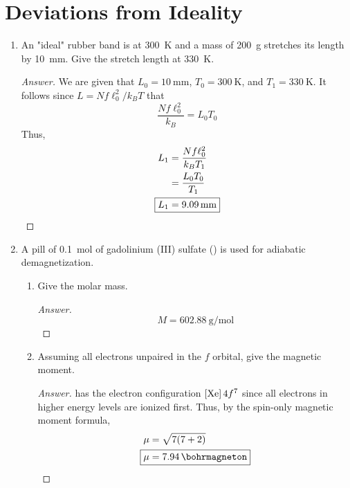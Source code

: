 \documentclass[../psets.tex]{subfiles}
\begin{document}
\section{Deviations from Ideality}
\begin{enumerate}
    \item {}An "ideal" rubber band is at \SI{300}{\kelvin} and a mass of \SI{200}{\gram} stretches its length by \SI{10}{\milli\meter}. Give the stretch length at \SI{330}{\kelvin}.
    \begin{proof}[Answer]
        We are given that $L_0=\SI{10}{\milli\meter}$, $T_0=\SI{300}{\kelvin}$, and $T_1=\SI{330}{\kelvin}$. It follows since $L=Nf\ell_0^2/k_BT$ that
        \begin{equation*}
            \frac{Nf\ell_0^2}{k_B} = L_0T_0
        \end{equation*}
        Thus,
        \begin{align*}
            L_1 &= \frac{Nf\ell_0^2}{k_BT_1}\\
            &= \frac{L_0T_0}{T_1}\\
            \Aboxed{L_1 &= \SI{9.09}{\milli\meter}}
        \end{align*}
    \end{proof}
    \item A pill of \SI{0.1}{\mole} of gadolinium (III) sulfate () is used for adiabatic demagnetization.
    \begin{enumerate}
        \item Give the molar mass.
        \begin{proof}[Answer]
            \begin{equation*}
                \boxed{M = \SI[per-mode=symbol]{602.88}{\gram\per\mole}}
            \end{equation*}
        \end{proof}
        \item Assuming all electrons unpaired in the $f$ orbital, give the magnetic moment.
        \begin{proof}[Answer]
             has the electron configuration $[\ce{Xe}]\,4f^7$ since all electrons in higher energy levels are ionized first. Thus, by the spin-only magnetic moment formula,
            \begin{align*}
                \mu &= \sqrt{7(7+2)}\\
                \Aboxed{\mu &= \SI{7.94}{\bohrmagneton}}
            \end{align*}
        \end{proof}

\end{enumerate}
\end{enumerate}
\end{document}
